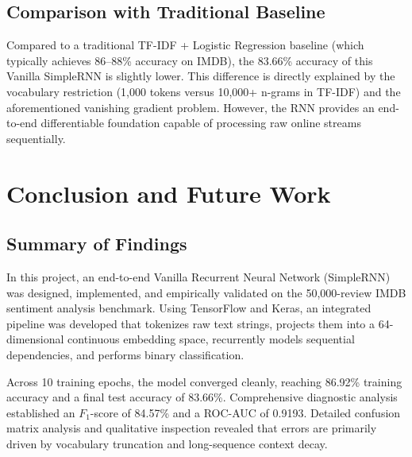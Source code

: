 \documentclass[11pt,a4paper]{article}
\begin{document}
\subsection{Comparison with Traditional Baseline}
Compared to a traditional TF-IDF + Logistic Regression baseline (which typically achieves 86--88\% accuracy on IMDB), the 83.66\% accuracy of this Vanilla SimpleRNN is slightly lower. This difference is directly explained by the vocabulary restriction (1,000 tokens versus 10,000+ n-grams in TF-IDF) and the aforementioned vanishing gradient problem. However, the RNN provides an end-to-end differentiable foundation capable of processing raw online streams sequentially.

\section{Conclusion and Future Work}
\label{sec:conclusion}

\subsection{Summary of Findings}
In this project, an end-to-end Vanilla Recurrent Neural Network (SimpleRNN) was designed, implemented, and empirically validated on the 50,000-review IMDB sentiment analysis benchmark. Using TensorFlow and Keras, an integrated pipeline was developed that tokenizes raw text strings, projects them into a 64-dimensional continuous embedding space, recurrently models sequential dependencies, and performs binary classification.

Across 10 training epochs, the model converged cleanly, reaching 86.92\% training accuracy and a final test accuracy of 83.66\%. Comprehensive diagnostic analysis established an $F_1$-score of 84.57\% and a ROC-AUC of 0.9193. Detailed confusion matrix analysis and qualitative inspection revealed that errors are primarily driven by vocabulary truncation and long-sequence context decay.
\end{document}

